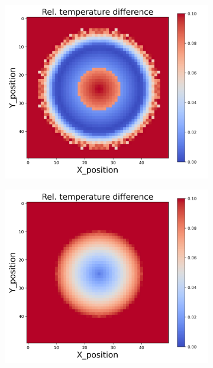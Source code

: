 \begin{figure}[h]
\begin{minipage}{\textwidth}
\begin{subfigure}{0.3\textwidth}
        \end{subfigure}
    \end{minipage}\\
    \begin{minipage}{\textwidth}
        \centering
        \begin{subfigure}{0.3\textwidth}
            \centering
            \includegraphics[width=\textwidth]{figures/raw_data/25/mix/T_bias.jpg}
        \end{subfigure}
        \begin{subfigure}{0.3\textwidth}
            \centering
            \includegraphics[width=\textwidth]{figures/raw_data/26/mix/T_bias.jpg}

\end{subfigure}
\end{minipage}
\end{figure}

